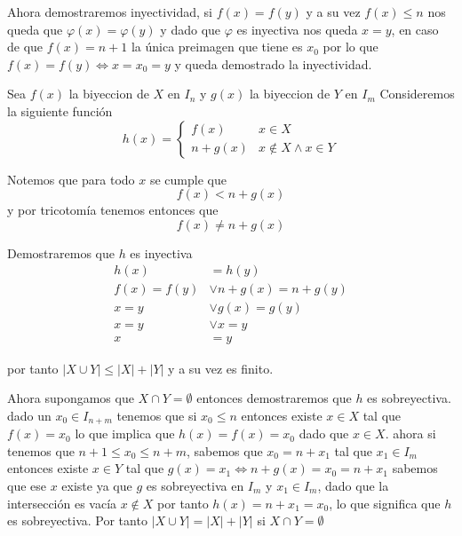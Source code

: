 \documentclass{homework}
\begin{document}
Ahora demostraremos inyectividad, si \(f(x) = f(y)\) y a su vez \(f(x) \leq n\)
nos queda que \(\varphi(x) = \varphi(y)\) y dado que \(\varphi\) es inyectiva nos queda
\(x = y\), en caso de que \(f(x) = n + 1\) la única preimagen que tiene es \(x_0\)
por lo que \(f(x) = f(y) \iff x = x_0 = y\) y queda demostrado la inyectividad.

\parte
Sea \(f(x)\) la biyeccion de \(X\) en \(I_n\) y \(g(x)\) la biyeccion de \(Y\) en \(I_m\)
Consideremos la siguiente función
\begin{equation*}
    h(x) = \begin{cases}
        f(x) & x \in X\\
        n + g(x) & x \notin X \land x \in Y
    \end{cases}
\end{equation*}

Notemos que para todo \(x\) se cumple que
\begin{equation*}
    f(x) < n + g(x)
\end{equation*}
y por tricotomía tenemos entonces que
\begin{equation*}
    f(x) \neq n + g(x)
\end{equation*}

Demostraremos que \(h\) es inyectiva
\begin{align*}
    h(x) &= h(y)\\
    f(x) = f(y) &\lor n + g(x) = n + g(y)\\
    x = y &\lor g(x) = g(y)\\
    x = y &\lor x = y\\
    x &= y
\end{align*}

por tanto \(|X \cup Y| \leq |X| + |Y|\) y a su vez es finito.

Ahora supongamos que \(X \cap Y = \emptyset\) entonces demostraremos que \(h\) es sobreyectiva.
dado un \(x_0 \in I_{n + m}\) tenemos que si \(x_0 \leq n\) entonces existe \(x \in X\) tal que \(f(x) = x_0\) lo que implica que \(h(x) = f(x) = x_0\) dado que \(x \in X\).
ahora si tenemos que \(n + 1 \leq x_0 \leq n + m\), sabemos que \(x_0 = n + x_1\) tal que \(x_1 \in I_m\) entonces existe \(x \in Y\) tal que \(g(x) = x_1 \iff n + g(x) = x_0 = n + x_1\)
sabemos que ese \(x\) existe ya que \(g\) es sobreyectiva en \(I_m\) y \(x_1 \in I_m\), dado que la intersección es vacía \(x \notin X\)
por tanto \(h(x) = n + x_1 = x_0\), lo que significa que \(h\) es sobreyectiva. Por tanto \(|X \cup Y| = |X| + |Y|\) si \(X \cap Y = \emptyset\)
\end{document}
